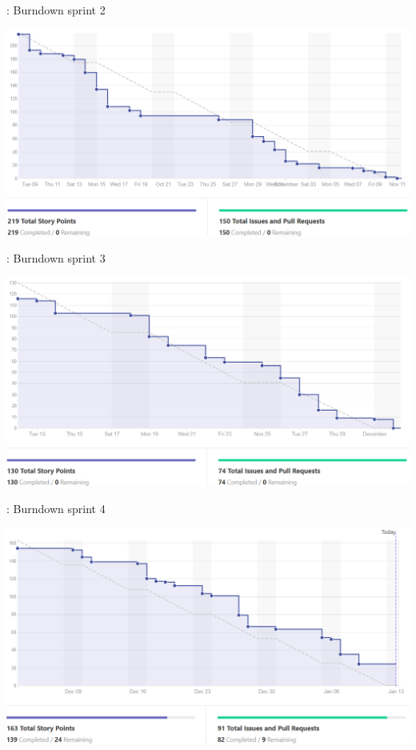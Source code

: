 \begin{frame}{\secname: Burndown sprint 2}
	\begin{center}
		\includegraphics[width=\linewidth]{images/burn2.png}
	\end{center}
\end{frame}

\begin{frame}{\secname: Burndown sprint 3}
	\begin{center}
		\includegraphics[width=\linewidth]{images/burn3.png}
	\end{center}
\end{frame}

\begin{frame}{\secname: Burndown sprint 4}
	\begin{center}
		\includegraphics[width=\linewidth]{images/burn4.png}
	\end{center}
\end{frame}
